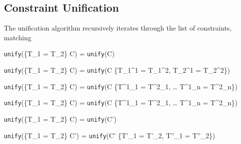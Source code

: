 \documentclass{article}
\begin{document}
\subsection{Constraint Unification}

The unification algorithm recursively iterates through the list of constraints, matching


    {\texttt{unify}(\{T_1 = T_2\} \cup C) = \texttt{unify}(C)}

    {\texttt{unify}(\{T_1 = T_2\} \cup C) = \texttt{unify}(C \cup \{T_1^1 = T_1^2, T_2^1 = T_2^2\})}

    {\texttt{unify}(\{T_1 = T_2\} \cup C) = \texttt{unify}(C \cup \{T^1_1 = T^2_1, \; \dots \; T^1_n = T^2_n\})}

    {\texttt{unify}(\{T_1 = T_2\} \cup C) = \texttt{unify}(C \cup \{T^1_1 = T^2_1, \; \dots \; T^1_n = T^2_n\})}

    {\texttt{unify}(\{T_1 = T_2\} \cup C) = \texttt{unify}(C')}

    {\texttt{unify}(\{T_1 = T_2\} \cup C') = \texttt{unify}(C' \cup \{T'_1 = T'_2, T''_1 = T''_2\})}
\end{document}
